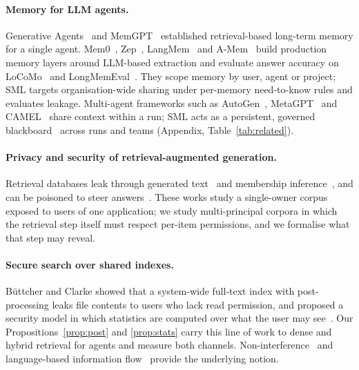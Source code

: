 \documentclass[11pt,a4paper]{article}
\theoremstyle{remark}
\newcommand{\sys}{SML}
\begin{document}
\paragraph{Memory for LLM agents.} Generative Agents~\cite{park2023generative} and MemGPT~\cite{packer2023memgpt}
established retrieval-based long-term memory for a single agent. Mem0~\cite{chhikara2025mem0}, Zep~\cite{rasmussen2025zep},
LangMem~\cite{langmem2025} and A-Mem~\cite{xu2025amem} build production memory layers around LLM-based extraction and
evaluate answer accuracy on LoCoMo~\cite{maharana2024locomo} and LongMemEval~\cite{wu2025longmemeval}. They scope memory by
user, agent or project; \sys{} targets organisation-wide sharing under per-memory need-to-know rules and evaluates leakage.
Multi-agent frameworks such as AutoGen~\cite{wu2023autogen}, MetaGPT~\cite{hong2024metagpt} and CAMEL~\cite{li2023camel}
share context within a run; \sys{} acts as a persistent, governed blackboard~\cite{wooldridge2009mas} across runs and teams
(Appendix, Table~\ref{tab:related}).

\begin{sloppypar}
\paragraph{Privacy and security of retrieval-augmented generation.} Retrieval databases leak through generated
text~\cite{zeng2024goodbad} and membership inference~\cite{anderson2025membership}, and can be poisoned to steer
answers~\cite{zou2025poisonedrag}. These works study a single-owner corpus exposed to users of one application; we study
multi-principal corpora in which the retrieval step itself must respect per-item permissions, and we formalise what that
step may reveal.
\end{sloppypar}

\paragraph{Secure search over shared indexes.} B{\"u}ttcher and Clarke showed that a system-wide full-text index with
post-processing leaks file contents to users who lack read permission, and proposed a security model in which statistics
are computed over what the user may see~\cite{buettcher2005security}. Our Propositions~\ref{prop:post} and \ref{prop:stats}
carry this line of work to dense and hybrid retrieval for agents and measure both channels. Non-interference~\cite{goguen1982noninterference}
and language-based information flow~\cite{sabelfeld2003language} provide the underlying notion.
\end{document}
